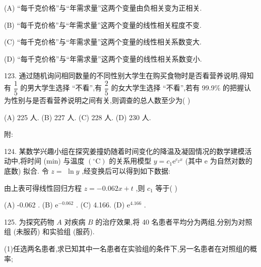 (A) “每千克价格”与“年需求量”这两个变量由负相关变为正相关.

(B) “每千克价格”与“年需求量”这两个变量的线性相关程度不变.

(C) “每千克价格”与“年需求量”这两个变量的线性相关系数变大.

(D) “每千克价格”与“年需求量”这两个变量的线性相关系数变小.

123. 通过随机询问相同数量的不同性别大学生在购买食物时是否看营养说明,得知有 $\dfrac{1}{5}$ 的男大学生选择 “不看”,有 $\dfrac{2}{5}$ 的女大学生选择 “不看”,若有 99.9\% 的把握认为性别与是否看营养说明之间有关,则调查的总人数至少为(   )

(A) 225 人. (B) 227 人. (C) 228 人. (D) 230 人.

附:

\begin{center}
\end{center}

124. 某数学兴趣小组在探究姜撞奶随着时间变化的降温及凝固情况的数学建模活动中,将时间 (min) 与温度 $\left( {{}^{ \circ  }\mathrm{C}}\right)$ 的关系用模型 $y = {c}_{1}{\mathrm{e}}^{{c}_{2}x}$ (其中 $\mathrm{e}$ 为自然对数的底数) 拟合. 令 $z =$  $\ln y$ ,经变换后可以得到如下数据:

\begin{center}
\end{center}

由上表可得线性回归方程 $z =  - {0.062x} + t$ ,则 ${c}_{1}$ 等于(   )

(A) -0.062 . (B) ${\mathrm{e}}^{-{0.062}}$ . (C) 4.166. (D) ${\mathrm{e}}^{4.166}$ .

125. 为探究药物 $A$ 对疾病 $B$ 的治疗效果,将 40 名患者平均分为两组,分别为对照组 (未服药) 和实验组 (服药).

(1)任选两名患者,求已知其中一名患者在实验组的条件下,另一名患者在对照组的概率;

